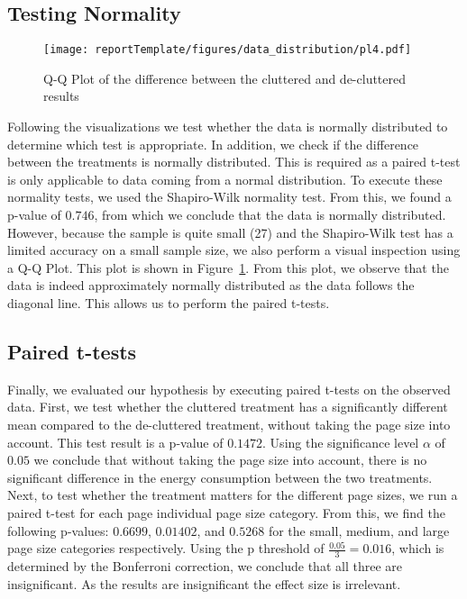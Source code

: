 \subsection{Testing Normality}

\begin{figure}[h]
\centering
\texttt{[image: reportTemplate/figures/data\_distribution/pl4.pdf]}
\caption{Q-Q Plot of the difference between the cluttered and de-cluttered results} \label{fig:qq-plot-difference}
\end{figure}

Following the visualizations we test whether the data is normally distributed to determine which test is appropriate. In addition, we check if the difference between the treatments is normally distributed. This is required as a paired t-test is only applicable to data coming from a normal distribution. To execute these normality tests, we used the Shapiro-Wilk normality test. From this, we found a p-value of $0.746$, from which we conclude that the data is normally distributed. However, because the sample is quite small (27) and the Shapiro-Wilk test has a limited accuracy on a small sample size, we also perform a visual inspection using a Q-Q Plot. This plot is shown in Figure~\ref{fig:qq-plot-difference}. From this plot, we observe that the data is indeed approximately normally distributed as the data follows the diagonal line. This allows us to perform the paired t-tests.

\subsection{Paired t-tests}

Finally, we evaluated our hypothesis by executing paired t-tests on the observed data. First, we test whether the cluttered treatment has a significantly different mean compared to the de-cluttered treatment, without taking the page size into account. This test result is a p-value of $0.1472$. Using the significance level $\alpha$ of $0.05$ we conclude that without taking the page size into account, there is no significant difference in the energy consumption between the two treatments. Next, to test whether the treatment matters for the different page sizes, we run a paired t-test for each page individual page size category. From this, we find the following p-values: $0.6699$, $0.01402$, and $0.5268$ for the small, medium, and large page size categories respectively. Using the p threshold of $\frac{0.05}{3} = 0.016$, which is determined by the Bonferroni correction, we conclude that all three are insignificant. As the results are insignificant the effect size is irrelevant.
